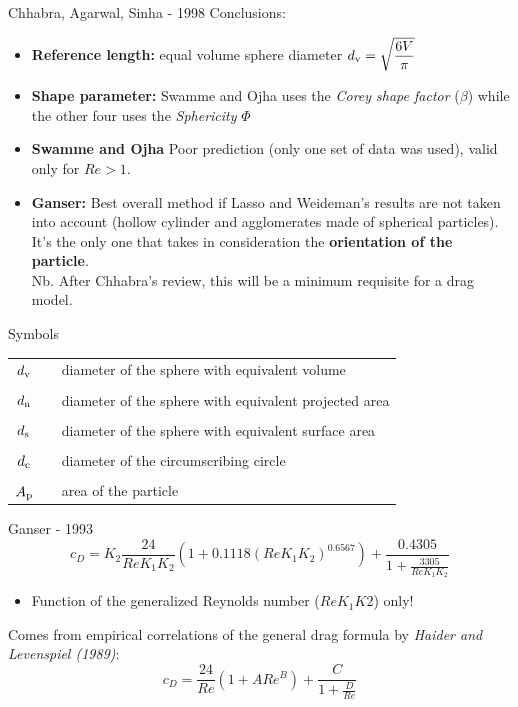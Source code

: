 \documentclass[11pt]{beamer}
\begin{document}
	\begin{frame}{Chhabra, Agarwal, Sinha - 1998}
		Conclusions:
		\begin{itemize}
			\item \textbf{Reference length:} equal volume sphere diameter $ d_{\textup{v}} = \sqrt{\dfrac{6 V}{\pi}} $
			\item \textbf{Shape parameter:} Swamme and Ojha uses the \textit{Corey shape factor} ($ \beta $) while the other four uses the \textit{Sphericity} $ \Phi $
			\item \textbf{Swamme and Ojha} Poor prediction (only one set of data was used), valid only for $ Re > 1 $.
			\item \textbf{Ganser:} Best overall method if Lasso and Weideman's results are not taken into account (hollow cylinder and agglomerates made of spherical particles). It's the only one that takes in consideration the \textbf{orientation of the particle}.\\
			Nb. After Chhabra's review, this will be a minimum requisite for a drag model.
		\end{itemize}
	\end{frame}

	\begin{frame}{Symbols}
		\begin{tabular}{ccl}
			$ d_{\textup{v}} $ & & diameter of the sphere with equivalent volume \\
			\\
			$ d_{\textup{n}} $ & & diameter of the sphere with equivalent projected area\\
			\\
			$ d_{\textup{s}} $ & & diameter of the sphere with equivalent surface area\\
			\\
			$ d_{\textup{c}} $ & & diameter of the circumscribing circle\\
			\\
			$ A_{\textup{p}} $ & & area of the particle
		\end{tabular}
	\end{frame}

	\begin{frame}{Ganser - 1993}
		\begin{equation*}
		c_D = K_2 \frac{24}{Re K_1 K_2} (1 + 0.1118 (Re K_1 K_2)^{0.6567}) + \frac{0.4305}{1 + \frac{3305}{Re K_1 K_2}}
		\end{equation*}
		\begin{itemize}
			\item Function of the generalized Reynolds number ($ Re K_1 K2 $) only!
		\end{itemize}
		\vfill
		Comes from empirical correlations of the general drag formula by \textit{Haider and Levenspiel (1989)}:
		\begin{equation*}
		c_D = \frac{24}{Re} (1 + A Re^B) + \dfrac{C}{1 + \frac{D}{Re}}
		\end{equation*}
	\end{frame}
	
\end{document}
